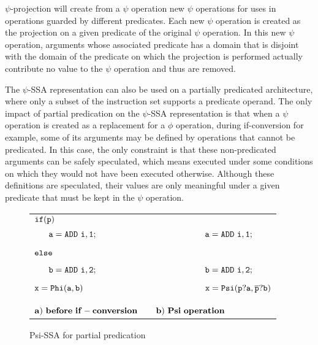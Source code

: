 $\psi$-projection will create from a $\psi$ operation new $\psi$
operations for uses in operations guarded by different
predicates. Each new $\psi$ operation is created as the projection on
a given predicate of the original $\psi$ operation. In this new $\psi$
operation, arguments whose associated predicate has a domain that is
disjoint with the domain of the predicate on which the projection is
performed actually contribute no value to the $\psi$ operation and
thus are removed.

The $\psi$-SSA representation can also be used on a partially
predicated architecture, where only a subset of the instruction set
supports a predicate operand. The only impact of partial predication
on the $\psi$-SSA representation is that when a $\psi$ operation is
created as a replacement for a $\phi$ operation, during if-conversion
for example, some of its arguments may be defined by operations that
cannot be predicated. In this case, the only constraint is that these
non-predicated arguments can be safely speculated, which means
executed under some conditions on which they would not have been
executed otherwise. Although these definitions are speculated, their
values are only meaningful under a given predicate that must be kept
in the $\psi$ operation.

\begin{figure*}
\begin{center}
\footnotesize
\begin{tabular}{llll}
${\tt if (p)}$                & & &\\
${\tt\ \ \ \ \ a = ADD\ i,1;}$ & \ \ \ \ \ \ \ \  & \ \ \ \ \ \ \ \  & ${\tt a = ADD\ i,1;}$ \\
${\tt else}$                  & \ \ \ \ \ \ \ \  & \ \ \ \ \ \ \ \  & \\
${\tt\ \ \ \ \ b = ADD\ i,2;}$ & \ \ \ \ \ \ \ \  & \ \ \ \ \ \ \ \  & ${\tt b = ADD\ i,2;}$ \\
${\tt x = Phi(a, b)}$         & \ \ \ \ \ \ \ \  & \ \ \ \ \ \ \ \  & ${\tt x = Psi(p?a, \overline{p}?b)}$\\
\\
\\
\multicolumn{2}{l}{${\tt{\bf a)\ before\ if-conversion}}$} & \multicolumn{2}{l}{${\tt{\bf b)\ Psi\ operation}}$}\\
\end{tabular}
\caption{Psi-SSA for partial predication}
\label{fig:psi_partial}
\end{center}
\end{figure*}

